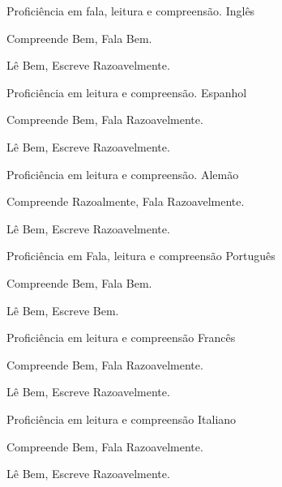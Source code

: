 \noindent
\vspace{-0.3cm}
\begin{multicols}{2}
\begin{cventries}
\noindent

\cventry
        {Proficiência em fala, leitura e compreensão.}
        {Inglês}{}{}
        {
         \begin{cvitems}
           \item {Compreende Bem, Fala Bem.}
           \item {Lê Bem, Escreve Razoavelmente.}
          \end{cvitems}
        }

\cventry
        {Proficiência em leitura e compreensão.}
        {Espanhol}{}{}
        {
         \begin{cvitems}
           \item {Compreende Bem, Fala Razoavelmente.}
           \item {Lê Bem, Escreve Razoavelmente.}
          \end{cvitems}
        }

\cventry
        {Proficiência em leitura e compreensão.}
        {Alemão}{}{}
        {
         \begin{cvitems}
           \item {Compreende Razoalmente, Fala Razoavelmente.}
           \item {Lê Bem, Escreve Razoavelmente.}
          \end{cvitems}
        }
\end{cventries}
\columnbreak
\begin{cventries}
\noindent

\cventry
      {Proficiência em Fala, leitura e compreensão}
      {Português}{}{}
      {
       \begin{cvitems}
         \item {Compreende Bem, Fala Bem.}
         \item {Lê Bem, Escreve Bem.}
        \end{cvitems}
      }

\cventry
      {Proficiência em leitura e compreensão}
      {Francês}{}{}
      {
       \begin{cvitems}
         \item {Compreende Bem, Fala Razoavelmente.}
         \item {Lê Bem, Escreve Razoavelmente.}
        \end{cvitems}
      }

\cventry
      {Proficiência em leitura e compreensão}
      {Italiano}{}{}
      {
       \begin{cvitems}
         \item {Compreende Bem, Fala Razoavelmente.}
         \item {Lê Bem, Escreve Razoavelmente.}
        \end{cvitems}
      }
\end{cventries}
\end{multicols}

